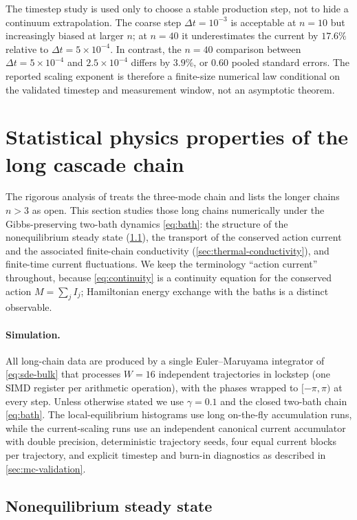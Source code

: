 \documentclass[11pt,a4paper]{article}
\theoremstyle{definition}
\numberwithin{equation}{section}   %
\begin{document}
The timestep study is used only to choose a stable production step, not to hide
a continuum extrapolation. The coarse step $\Delta t=10^{-3}$ is acceptable at
$n=10$ but increasingly biased at larger $n$; at $n=40$ it underestimates the
current by $17.6\%$ relative to $\Delta t=5\times10^{-4}$. In contrast, the
$n=40$ comparison between $\Delta t=5\times10^{-4}$ and
$2.5\times10^{-4}$ differs by $3.9\%$, or $0.60$ pooled standard errors. The
reported scaling exponent is therefore a finite-size numerical law conditional
on the validated timestep and measurement window, not an asymptotic theorem.

\section{Statistical physics properties of the long cascade chain}\label{sec:long-chain}

The rigorous analysis of \cite{HLNS} treats the three-mode chain and lists the
longer chains $n>3$ as open. This section studies those long chains
numerically under the Gibbs-preserving two-bath dynamics \eqref{eq:bath}: the
structure of the nonequilibrium steady state (\cref{sec:ness-long}), the
transport of the conserved action current and the associated finite-chain
conductivity (\cref{sec:thermal-conductivity}), and finite-time current
fluctuations. We keep the terminology ``action current'' throughout, because
\eqref{eq:continuity} is a continuity equation for the conserved action
$M=\sum_j I_j$; Hamiltonian energy exchange with the baths is a distinct
observable.

\paragraph{Simulation.}
All long-chain data are produced by a single Euler--Maruyama integrator of
\eqref{eq:sde-bulk} that processes $W=16$ independent trajectories in lockstep
(one SIMD register per arithmetic operation), with the phases wrapped to
$[-\pi,\pi)$ at every step. Unless otherwise stated we use $\gamma=0.1$ and the
closed two-bath chain \eqref{eq:bath}. The local-equilibrium histograms use
long on-the-fly accumulation runs, while the current-scaling runs use an
independent canonical current accumulator with double precision, deterministic
trajectory seeds, four equal current blocks per trajectory, and explicit
timestep and burn-in diagnostics as described in \cref{sec:mc-validation}.

\subsection{Nonequilibrium steady state}\label{sec:ness-long}
\end{document}
